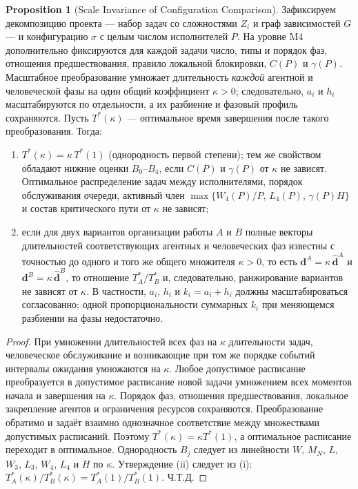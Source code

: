 \documentclass[12pt,a4paper]{article}
\theoremstyle{definition}
\newtheorem{proposition}{Proposition}
\begin{document}
\begin{proposition}[Scale Invariance of Configuration Comparison]\label{prop:invariance}
Зафиксируем декомпозицию проекта --- набор задач со сложностями $Z_i$ и граф
зависимостей $G$ --- и конфигурацию $\sigma$ с целым числом исполнителей $P$.
На уровне M4 дополнительно фиксируются для каждой задачи число, типы и порядок
фаз, отношения предшествования, правило локальной блокировки, $C(P)$ и
$\gamma(P)$. Масштабное преобразование умножает длительность \emph{каждой}
агентной и человеческой фазы на один общий коэффициент $\kappa>0$; следовательно,
$a_i$ и $h_i$ масштабируются по отдельности, а их разбиение и фазовый профиль
сохраняются. Пусть $T^{*}(\kappa)$ --- оптимальное время завершения после такого
преобразования. Тогда:
\begin{enumerate}
  \item $T^{*}(\kappa) = \kappa\, T^{*}(1)$ (однородность первой степени); тем же свойством обладают нижние оценки $B_0$--$B_4$, если $C(P)$ и $\gamma(P)$ от $\kappa$ не зависят. Оптимальное распределение задач между исполнителями, порядок обслуживания очереди, активный член $\max\{W_4(P)/P,\,L_4(P),\,\gamma(P)H\}$ и состав критического пути от $\kappa$ не зависят;
  \item если для двух вариантов организации работы $A$ и $B$ полные векторы длительностей соответствующих агентных и человеческих фаз известны с точностью до одного и того же общего множителя $\kappa>0$, то есть $\mathbf d^{A}=\kappa\,\hat{\mathbf d}^{A}$ и $\mathbf d^{B}=\kappa\,\hat{\mathbf d}^{B}$, то отношение $T^{*}_A/T^{*}_B$ и, следовательно, ранжирование вариантов не зависят от $\kappa$. В частности, $a_i$, $h_i$ и $k_i=a_i+h_i$ должны масштабироваться согласованно; одной пропорциональности суммарных $k_i$ при меняющемся разбиении на фазы недостаточно.
\end{enumerate}
\end{proposition}

\begin{proof}
При умножении длительностей всех фаз на $\kappa$ длительности задач, человеческое обслуживание и возникающие при том же порядке событий интервалы ожидания умножаются на $\kappa$. Любое допустимое расписание преобразуется в допустимое расписание новой задачи умножением всех моментов начала и завершения на $\kappa$. Порядок фаз, отношения предшествования, локальное закрепление агентов и ограничения ресурсов сохраняются. Преобразование обратимо и задаёт взаимно однозначное соответствие между множествами допустимых расписаний. Поэтому $T^{*}(\kappa)=\kappa T^{*}(1)$, а оптимальное расписание переходит в оптимальное. Однородность $B_j$ следует из линейности $W$, $M_N$, $L$, $W_3$, $L_3$, $W_4$, $L_4$ и $H$ по $\kappa$. Утверждение (ii) следует из (i): $T^{*}_A(\kappa)/T^{*}_B(\kappa)=T^{*}_A(1)/T^{*}_B(1)$. Ч.Т.Д.
\end{proof}
\end{document}

